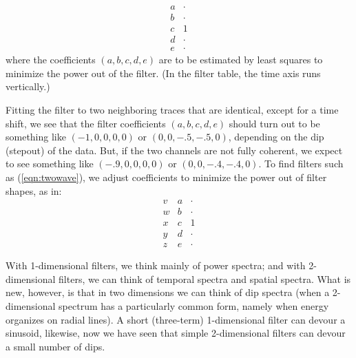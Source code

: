 \begin{equation}
   \begin{array}{cc}
        a & \cdot  \\
        b & \cdot  \\
        c &   1    \\
        d & \cdot  \\
        e & \cdot
        \end{array}
\label{eqn:onedip}
\end{equation}
where the coefficients
$(a,b,c,d,e)$
are to be estimated by least squares 
to minimize the power out of the filter.
(In the filter table,
the time axis runs vertically.)
\par
Fitting the filter to two neighboring traces
that are identical, except for a time shift, we see that
the filter coefficients $(a,b,c,d,e)$ should turn out to be
something like $(-1,0,0,0,0)$ or
$(0,0,-.5,-.5, 0)$,
depending on the dip (stepout) of the data.
But, if the two channels are not fully coherent, we expect to see
something like
$(-.9,0,0,0,0)$ or
$(0,0,-.4,-.4,0)$.
To find filters such as (\ref{eqn:twowave}),
we adjust coefficients to minimize the power out
of filter shapes, as in:
\begin{equation}
        \begin{array}{ccccc}
                v  & a & \cdot \\
                w  & b & \cdot \\
                x  & c &   1    \\
                y  & d & \cdot \\
                z  & e & \cdot 
        \end{array}
\end{equation}
\par
With 1-dimensional filters,
we think mainly of power spectra;
and with 2-dimensional filters,
we can think of temporal spectra and spatial spectra.
What is new, however,
is that in two dimensions we can think of dip spectra
(when a 2-dimensional spectrum has a particularly common form,
namely when energy organizes on radial lines).
A short (three-term) 1-dimensional filter can devour a sinusoid,
likewise, now we have seen that simple 2-dimensional filters can devour
a small number of dips.

